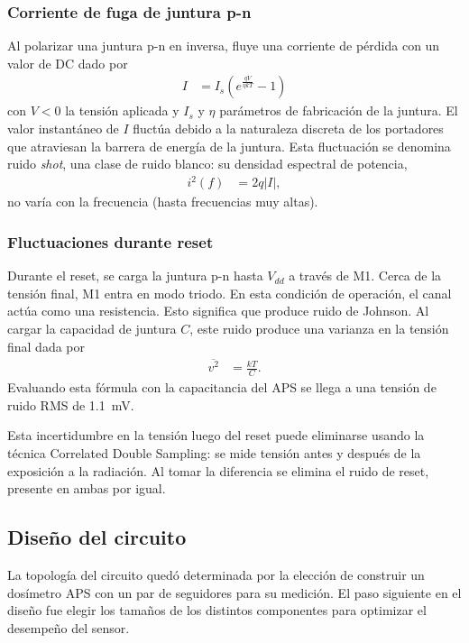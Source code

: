 \subsubsection{Corriente de fuga de juntura p-n}
Al polarizar una juntura p-n en inversa, fluye una corriente de
pérdida\cite{sze_physics_2007} con un valor de DC dado por
\begin{align*}
    I&=I_s(e^{\frac{qV}{\eta kT}}-1)
\end{align*}
con $V<0$ la tensión aplicada y $I_s$ y $\eta$ parámetros de fabricación de la
juntura.
El valor instantáneo de $I$ fluctúa debido a la naturaleza discreta de los portadores que
atraviesan la barrera de energía de la juntura.
Esta fluctuación se denomina ruido \emph{shot}, una clase de ruido blanco:
su densidad espectral de potencia,
\begin{align*}
    i^2(f) &= 2q|I|,
\end{align*}
no varía con la frecuencia (hasta frecuencias muy altas).
\subsubsection{Fluctuaciones durante reset}
Durante el reset, se carga la juntura p-n hasta $V_{dd}$ a través de M1.
Cerca de la tensión final, M1 entra en modo triodo.
En esta condición de operación, el canal actúa como una resistencia.
Esto significa que produce ruido de Johnson\cite{baker_cmos_2010}.
Al cargar la capacidad de juntura $C$, 
este ruido produce una varianza en la tensión final dada por
\begin{align*}
    \overline{v^2} &= \frac{kT}C.
\end{align*}
Evaluando esta fórmula con la capacitancia del APS
se llega a una tensión de ruido RMS de \SI{1.1}{\milli\volt}.

Esta incertidumbre en la tensión luego del reset puede eliminarse usando 
la técnica Correlated Double Sampling\cite{white_characterization_1974}:
se mide tensión antes y después de la exposición a la radiación.
Al tomar la diferencia se elimina el ruido de reset,
presente en ambas por igual.

\subsection{Diseño del circuito}
\label{section:diseno_aps}
La topología del circuito quedó determinada por la elección de construir un
dosímetro APS con un par de seguidores para su medición.
El paso siguiente en el diseño fue elegir los tamaños de los distintos
componentes para optimizar el desempeño del sensor.

